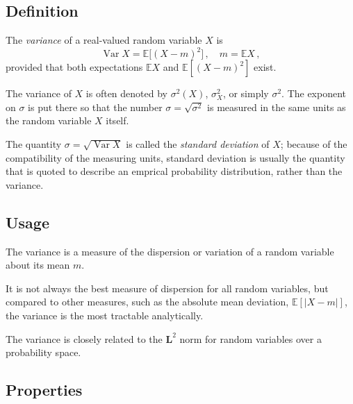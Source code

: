 \documentclass{article}
\newcommand{\abs}[1]{\lvert#1\rvert}
\newcommand{\Le}{\mathbf{L}}
\newcommand{\E}{\mathbb{E}}
\DeclareMathOperator{\Var}{Var}
\begin{document}


\subsection*{Definition}
The \emph{variance} of a real-valued random variable $X$ is
\[
\Var X = \E\bigl[ (X - m)^2 \bigr]\,, \quad m = \E X\,,
\]
provided that both expectations $\E X$ and $\E[(X-m)^2]$ exist.

The variance of $X$ is often denoted by $\sigma^2(X)$, $\sigma^2_X$,
or simply $\sigma^2$.
The exponent on $\sigma$ is put there so that the number 
$\sigma = \sqrt{\sigma^2}$ 
is measured in the same units as the random variable $X$
itself.  

The quantity $\sigma = \sqrt{\Var X}$ is called the \emph{standard deviation}
of $X$; 
because of the compatibility of the measuring units, 
standard deviation is usually the quantity that is quoted
to describe an emprical probability distribution, rather than the variance.

\subsection*{Usage}

The variance is a measure of the dispersion or variation
of a random variable
about its mean $m$.

It is not always the best measure of dispersion for all random variables,
but compared to other measures,
such as the absolute mean deviation, $\E[ \abs{X-m} ]$,
the variance is the most tractable analytically.

The variance is closely related to the $\Le^2$ norm for
random variables over a probability space.

\subsection*{Properties}
\end{document}
